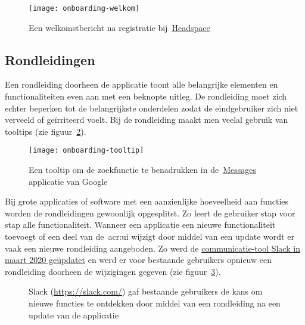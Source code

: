 \begin{figure}[h!]
    \centering
    \texttt{[image: onboarding-welkom]}
    \caption[Voorbeeld welkomstbericht]{Een welkomstbericht na registratie bij~\href{https://www.headspace.com/}{Headspace}}
    \label{fig:onboarding:welkom}
\end{figure}

\subsection{Rondleidingen}
\label{sec:onboarding:rondleidingen}

Een rondleiding doorheen de applicatie toont alle belangrijke elementen en functionaliteiten even aan met een beknopte uitleg. De rondleiding moet zich echter beperken tot de belangrijkste onderdelen zodat de eindgebruiker zich niet verveeld of geïrriteerd voelt. Bij de rondleiding maakt men veelal gebruik van tooltips (zie figuur~\ref{fig:onboarding:rondleiding}).

\begin{figure}[h!]
    \centering
    \texttt{[image: onboarding-tooltip]}
    \caption[Voorbeeld tooltip]{Een tooltip om de zoekfunctie te benadrukken in de~\href{https://messages.google.com/}{Messages} applicatie van Google}
    \label{fig:onboarding:rondleiding}
\end{figure}

Bij grote applicaties of software met een aanzienlijke hoeveelheid aan functies worden de rondleidingen gewoonlijk opgesplitst. Zo leert de gebruiker stap voor stap alle functionaliteit. Wanneer een applicatie een nieuwe functionaliteit toevoegt of een deel van de~\acrshort{acr:ui} wijzigt door middel van een update wordt er vaak een nieuwe rondleiding aangeboden. Zo werd de \href{https://www.theverge.com/2020/3/18/21184865/slack-redesign-update-sidebar-changes-available-now-download}{communicatie-tool Slack in maart 2020 geüpdatet} en werd er voor bestaande gebruikers opnieuw een rondleiding doorheen de wijzigingen gegeven (zie figuur~\ref{fig:onboarding:rondleiding-slack}).

\begin{figure}[h!]
    \centering
    \qquad
    \caption[Voorbeeld rondleiding Slack]{Slack (\url{https://slack.com/}) gaf bestaande gebruikers de kans om nieuwe functies te ontdekken door middel van een rondleiding na een update van de applicatie}
    \label{fig:onboarding:rondleiding-slack}
\end{figure}

